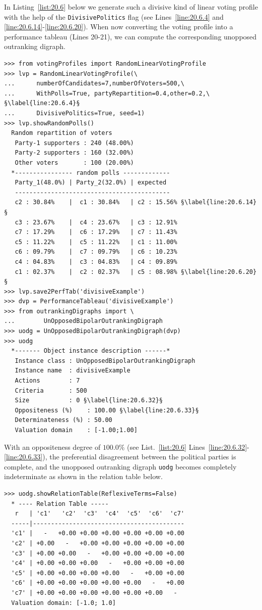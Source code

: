 In Listing~\vref{list:20.6} below we generate such a divisive kind of linear voting profile with the help of the \texttt{DivisivePolitics} flag (see Lines~\ref{line:20.6.4} and \ref{line:20.6.14}-\ref{line:20.6.20}). When now converting the voting profile into a performance tableau (Lines 20-21), we can compute the corresponding unopposed outranking digraph.
\begin{lstlisting}[caption={A divisive two-party example of a random linear voting profile},label=list:20.6]
>>> from votingProfiles import RandomLinearVotingProfile		     
>>> lvp = RandomLinearVotingProfile(\
...      numberOfCandidates=7,numberOfVoters=500,\
...      WithPolls=True, partyRepartition=0.4,other=0.2,\ §\label{line:20.6.4}§
...      DivisivePolitics=True, seed=1)
>>> lvp.showRandomPolls()
  Random repartition of voters
   Party-1 supporters : 240 (48.00%)
   Party-2 supporters : 160 (32.00%)
   Other voters       : 100 (20.00%)
  *---------------- random polls -------------
   Party_1(48.0%) | Party_2(32.0%) | expected  
   -------------------------------------------
   c2 : 30.84%    |  c1 : 30.84%   | c2 : 15.56% §\label{line:20.6.14}§
   c3 : 23.67%    |  c4 : 23.67%   | c3 : 12.91%
   c7 : 17.29%    |  c6 : 17.29%   | c7 : 11.43%
   c5 : 11.22%    |  c5 : 11.22%   | c1 : 11.00%
   c6 : 09.79%    |  c7 : 09.79%   | c6 : 10.23%
   c4 : 04.83%    |  c3 : 04.83%   | c4 : 09.89%
   c1 : 02.37%    |  c2 : 02.37%   | c5 : 08.98% §\label{line:20.6.20}§
>>> lvp.save2PerfTab('divisiveExample')
>>> dvp = PerformanceTableau('divisiveExample')
>>> from outrankingDigraphs import \
...        UnOpposedBipolarOutrankingDigraph
>>> uodg = UnOpposedBipolarOutrankingDigraph(dvp)
>>> uodg
  *------- Object instance description ------*
   Instance class : UnOpposedBipolarOutrankingDigraph
   Instance name  : divisiveExample
   Actions        : 7
   Criteria       : 500
   Size           : 0 §\label{line:20.6.32}§
   Oppositeness (%)    : 100.00 §\label{line:20.6.33}§
   Determinateness (%) : 50.00
   Valuation domain    : [-1.00;1.00]
\end{lstlisting}

With an oppositeness degree of $100.0\%$ (see List.~\vref{list:20.6} Lines~\ref{line:20.6.32}-\ref{line:20.6.33}), the preferential disagreement between the political parties is complete, and the unopposed outranking digraph \texttt{uodg} becomes completely indeterminate as shown in the relation table below.
\begin{lstlisting}
>>> uodg.showRelationTable(ReflexiveTerms=False)
  * ---- Relation Table -----
   r   | 'c1'   'c2'  'c3'  'c4'  'c5'  'c6'  'c7'   
  -----|------------------------------------------
  'c1' |   -   +0.00 +0.00 +0.00 +0.00 +0.00 +0.00  
  'c2' | +0.00   -   +0.00 +0.00 +0.00 +0.00 +0.00  
  'c3' | +0.00 +0.00   -   +0.00 +0.00 +0.00 +0.00  
  'c4' | +0.00 +0.00 +0.00   -   +0.00 +0.00 +0.00  
  'c5' | +0.00 +0.00 +0.00 +0.00   -   +0.00 +0.00  
  'c6' | +0.00 +0.00 +0.00 +0.00 +0.00   -   +0.00  
  'c7' | +0.00 +0.00 +0.00 +0.00 +0.00 +0.00   -   
  Valuation domain: [-1.0; 1.0]
\end{lstlisting}      

